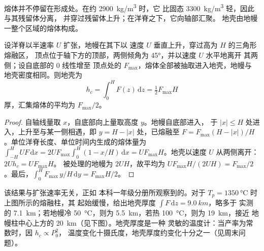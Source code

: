 熔体并不停留在形成处。在约 \qty{2900}{kg/m^3} 时，它
比固态 \qty{3300}{kg/m^3} 轻，因此与其残留体分离，
并穿过残留体上升；在洋脊之下，它向轴部汇聚。
地壳由地幔一整个区域的熔体构成。

\begin{proposition}[三角形熔融区的地壳]\label{prop:b2:mantle-melting:triangle}
设洋脊以半速率 $U$ 扩张，地幔在其下以
速度 $U$ 垂直上升，穿过高为 $H$ 的三角形熔融区，
顶点位于轴下方的顶部，两侧倾角为 \ang{45}，并以速度 $U$ 水平地离开
其两侧；设自底部的 $0$ 线性增至
顶点处的 $F_{\max}$，熔体全部被抽取进入地壳，地幔与
地壳密度相同。则地壳为
\[
  h_c = \int_0^H F(z)\,\mathrm dz = \tfrac12 F_{\max}H
\]
厚，汇集熔体的平均为 $F_{\max}/2$。
\end{proposition}

\begin{proof}
自轴线量取 $x$，自底部向上量取高度 $y$。地幔自底部进入，
于 $|x| \le H$ 处进入，上升至与某一侧相遇，即 $y = H - |x|$ 处，已熔融至
$F = F_{\max}(H - |x|)/H$。单位洋脊长度、单位时间内生成的熔体量为
$\int_{-H}^{H} U F\,\mathrm dx = 2UF_{\max}\int_0^H (1 - x/H)\,\mathrm dx =
UF_{\max}H$。地壳以速度 $U$ 从两侧离开：$2Uh_c = UF_{\max}H$。
被处理的地幔为 $2UH$，故平均为 $UF_{\max}H/(2UH) =
F_{\max}/2$。最后，$\int_0^H F_{\max}\,y/H\,\mathrm dy = F_{\max}H/2$。
\end{proof}

该结果与扩张速率无关，正如
本科一年级分册所观察到的。对于 $T_p = \qty{1350}{\celsius}$ 时上图所示的熔融柱，其
起始缓慢，给出地壳厚度 $\int F\,\mathrm dz = \qty{9.0}{km}$，略多于
实测的 \qty{7.1}{km}；若地幔冷 \qty{50}{\celsius}，则为
\qty{5.5}{km}，若热 \qty{100}{\celsius}，则为 \qty{19}{km}，接近
地幔柱中心上方的 \qty{20}{km}（见下图）。地壳厚度是一种
灵敏的温度计：当产率为常数时，因 $h_c \propto P_0^2$，
温度变化十摄氏度，地壳厚度约变化十分之一（见周末问题）。

